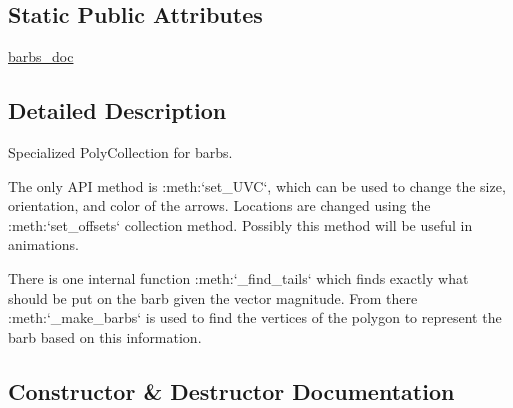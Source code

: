\subsection*{Static Public Attributes}
\begin{DoxyCompactItemize}
\item 
\hyperlink{classmatplotlib_1_1quiver_1_1Barbs_a4e4628a179c8526cb2a5174ce7d9e579}{barbs\+\_\+doc}
\end{DoxyCompactItemize}


\subsection{Detailed Description}
\begin{DoxyVerb}Specialized PolyCollection for barbs.

The only API method is :meth:`set_UVC`, which can be used to
change the size, orientation, and color of the arrows.  Locations
are changed using the :meth:`set_offsets` collection method.
Possibly this method will be useful in animations.

There is one internal function :meth:`_find_tails` which finds
exactly what should be put on the barb given the vector magnitude.
From there :meth:`_make_barbs` is used to find the vertices of the
polygon to represent the barb based on this information.
\end{DoxyVerb}
 

\subsection{Constructor \& Destructor Documentation}
\mbox{\label{classmatplotlib_1_1quiver_1_1Barbs_a7c8dec1ccbe4ab0caf9fcd4a13e77488}} 
